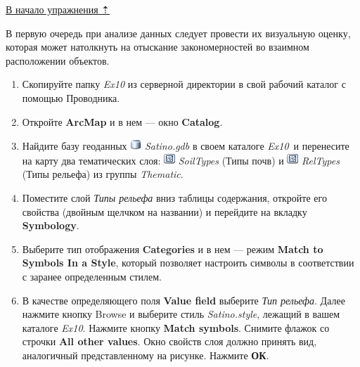 \documentclass[12pt,]{book}
\begin{document}
\protect\hyperlink{overlay}{В начало упражнения ⇡}

В первую очередь при анализе данных следует провести их визуальную оценку, которая может натолкнуть на отыскание закономерностей во взаимном расположении объектов.

\begin{enumerate}
\def\labelenumi{\arabic{enumi}.}
\item
  Скопируйте папку \emph{Ex10} из серверной директории в свой рабочий каталог с помощью Проводника.
\item
  Откройте \textbf{ArcMap} и в нем --- окно \textbf{Catalog}.
\item
  Найдите базу геоданных \includegraphics{images/Ex10/image2.png} \emph{Satino.gdb} в своем каталоге \emph{Ex10}~и перенесите на карту два тематических слоя: \includegraphics{images/Ex10/image3.png} \emph{SoilTypes} (Типы почв) и \includegraphics{images/Ex10/image3.png} \emph{RelTypes} (Типы рельефа) из группы \emph{Thematic}.
\item
  Поместите слой \emph{Типы рельефа} вниз таблицы содержания, откройте его свойства (двойным щелчком на названии) и перейдите на вкладку \textbf{Symbology}.
\item
  Выберите тип отображения \textbf{Categories} и в нем --- режим \textbf{Match to Symbols In a Style}, который позволяет настроить символы в соответствии с заранее определенным стилем.
\item
  В качестве определяющего поля \textbf{Value field} выберите \emph{Тип рельефа}. Далее нажмите кнопку Browse и выберите стиль \emph{Satino.style}, лежащий в вашем каталоге \emph{Ex10}. Нажмите кнопку \textbf{Match symbols}. Снимите флажок со строчки \textbf{All other values}. Окно свойств слоя должно принять вид, аналогичный представленному на рисунке. Нажмите \textbf{ОК}.


\end{enumerate}
\end{document}
